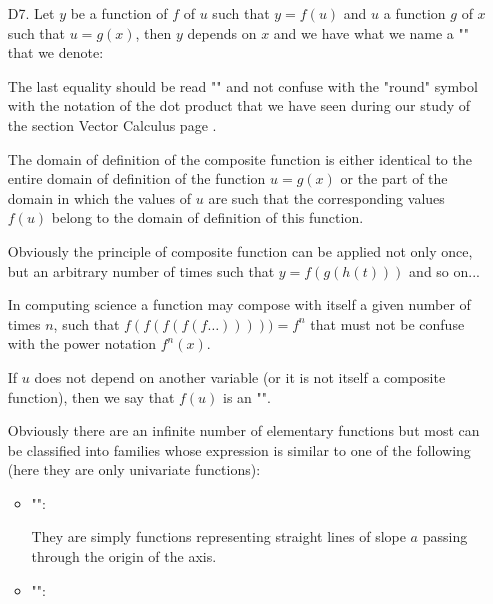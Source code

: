 \begin{enumerate}
		\item[D7.] Let $y$ be a function of $f$ of $u$ such that $y=f(u)$ and $u$ a function $g$ of $x$ such that $u=g(x)$, then $y$ depends on $x$ and we have what we name a "\label{composite function}" that we denote:
		
		The last equality should be read "" and not confuse with the "round" symbol with the notation of the dot product that we have seen during our study of the section Vector Calculus page \pageref{dot product}.
		
		The domain of definition of the composite function is either identical to the entire domain of definition of the function $u=g(x)$ or the part of the domain in which the values of $u$ are such that the corresponding values $f (u)$ belong to the domain of definition of this function.
		
		Obviously the principle of composite function can be applied not only once, but an arbitrary number of times such that $y=f(g(h(t)))$ and so on...
		
		In computing science a function may compose with itself a given number of times $n$, such that $f(f(f(f(f\ldots )))))=f^n$ that must not be confuse with the power notation $f^n(x)$.
		
		If $u$ does not depend on another variable (or it is not itself a composite function), then we say that $f(u)$ is an "".

		Obviously there are an infinite number of elementary functions but most can be classified into families whose expression is similar to one of the following (here they are only univariate functions):
		\begin{itemize}
			\item "":
			
			They are simply functions representing straight lines of slope $a$ passing through the origin of the axis.
			
			\item "":
			

\end{itemize}
\end{enumerate}
